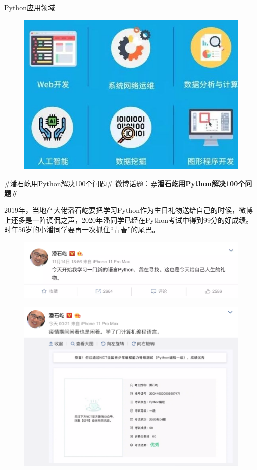 \documentclass[11pt]{beamer}
\begin{document}
\begin{frame}{Python应用领域}
	\begin{figure}
		\centering
		\includegraphics[width=0.8\linewidth]{figures/python-field}
		\label{fig:python-field}
	\end{figure}
\end{frame}

\begin{frame}[allowframebreaks]{\#潘石屹用Python解决100个问题\#}
	微博话题：\textbf{\#潘石屹用Python解决100个问题\#}\cite{panshiyi100}
	
	2019年，当地产大佬潘石屹要把学习Python作为生日礼物送给自己的时候，微博上还多是一阵调侃之声，2020年潘同学已经在Python考试中得到99分的好成绩。时年56岁的小潘同学要再一次抓住“青春”的尾巴。
	\begin{figure}
		\centering
		\includegraphics[width=0.7\linewidth]{figures/pythonPanshiyi01}
		\label{fig:pythonpanshiyi01}
	\end{figure}

	\begin{figure}
	\centering
	\includegraphics[width=0.8\linewidth]{figures/pythonPanshiyi03}
	\label{fig:pythonpanshiyi03}
\end{figure}
\end{frame}
\end{document}
